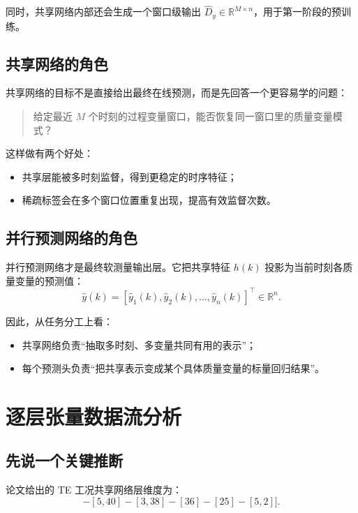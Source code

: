 \documentclass[UTF8]{ctexart}
\begin{document}
同时，共享网络内部还会生成一个窗口级输出 $\hat{D}_y \in \mathbb{R}^{M \times n}$，用于第一阶段的预训练。

\subsection{共享网络的角色}

共享网络的目标不是直接给出最终在线预测，而是先回答一个更容易学的问题：
\begin{quote}
给定最近 $M$ 个时刻的过程变量窗口，能否恢复同一窗口里的质量变量模式？
\end{quote}

这样做有两个好处：
\begin{itemize}
    \item 共享层能被多时刻监督，得到更稳定的时序特征；
    \item 稀疏标签会在多个窗口位置重复出现，提高有效监督次数。
\end{itemize}

\subsection{并行预测网络的角色}

并行预测网络才是最终软测量输出层。它把共享特征 $h(k)$ 投影为当前时刻各质量变量的预测值：
\begin{equation}
    \hat{y}(k) = [\hat{y}_1(k), \hat{y}_2(k), \dots, \hat{y}_n(k)]^\top \in \mathbb{R}^{n}.
\end{equation}

因此，从任务分工上看：
\begin{itemize}
    \item 共享网络负责“抽取多时刻、多变量共同有用的表示”；
    \item 每个预测头负责“把共享表示变成某个具体质量变量的标量回归结果”。
\end{itemize}

\section{逐层张量数据流分析}

\subsection{先说一个关键推断}

论文给出的 TE 工况共享网络层维度为：
\begin{equation}
    [[5,33]-[5,40]-[3,38]-[36]-[25]-[5,2]].
\end{equation}
\end{document}
